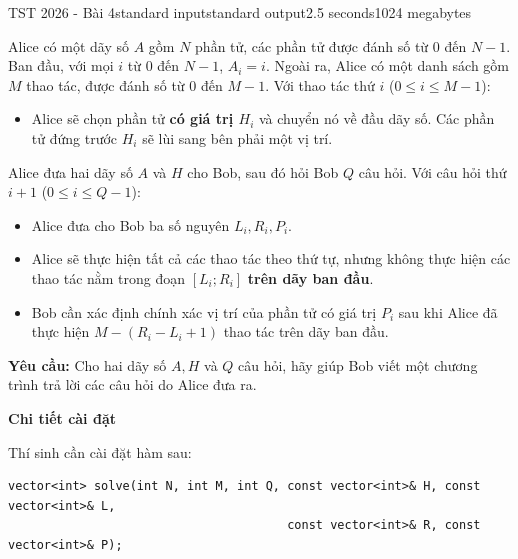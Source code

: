 \begin{problem}{TST 2026 - Bài 4}{standard input}{standard output}{2.5 seconds}{1024 megabytes}

Alice có một dãy số $A$ gồm $N$ phần tử, các phần tử được đánh số từ $0$ đến $N-1$. Ban đầu, với mọi $i$ từ $0$ đến $N-1$, $A_i=i$. Ngoài ra, Alice có một danh sách gồm $M$ thao tác, được đánh số từ $0$ đến $M-1$. Với thao tác thứ $i$ ($0\le i\le M-1$):
\begin{itemize}
   \item Alice sẽ chọn phần tử \textbf{có giá trị $H_i$} và chuyển nó về đầu dãy số. Các phần tử đứng trước $H_i$ sẽ lùi sang bên phải một vị trí.
\end{itemize}

Alice đưa hai dãy số $A$ và $H$ cho Bob, sau đó hỏi Bob $Q$ câu hỏi. Với câu hỏi thứ $i+1$ ($0\le i\le Q-1$):
\begin{itemize}
   \item Alice đưa cho Bob ba số nguyên $L_i,R_i,P_i$.
   \item Alice sẽ thực hiện tất cả các thao tác theo thứ tự, nhưng không thực hiện các thao tác nằm trong đoạn $[L_i;R_i]$ \textbf{trên dãy ban đầu}.
   \item Bob cần xác định chính xác vị trí của phần tử có giá trị $P_i$ sau khi Alice đã thực hiện $M-(R_i-L_i+1)$ thao tác trên dãy ban đầu.
\end{itemize}

\textbf{Yêu cầu:} Cho hai dãy số $A,H$ và $Q$ câu hỏi, hãy giúp Bob viết một chương trình trả lời các câu hỏi do Alice đưa ra.

\InputFile
\textbf{Chi tiết cài đặt}

Thí sinh cần cài đặt hàm sau:

\begin{lstlisting}
vector<int> solve(int N, int M, int Q, const vector<int>& H, const vector<int>& L,
                                       const vector<int>& R, const vector<int>& P);
\end{lstlisting}


\end{problem}
